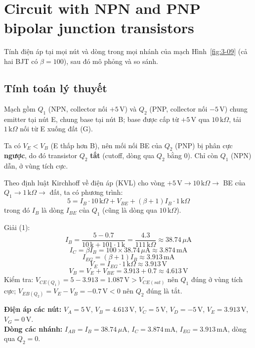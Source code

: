 \section{Circuit with NPN and PNP bipolar junction transistors}
Tính điện áp tại mọi nút và dòng trong mọi nhánh của mạch Hình~\ref{fig:3-09} (cả hai BJT có $\beta = 100$), sau đó mô phỏng và so sánh.


\subsection{Tính toán lý thuyết}
Mạch gồm $Q_1$ (NPN, collector nối $+5\,\text{V}$) và $Q_2$ (PNP, collector nối $-5\,\text{V}$) chung emitter tại nút E, chung base tại nút B; base được cấp từ $+5\,\text{V}$ qua $10\,\text{k}\Omega$, tải $1\,\text{k}\Omega$ nối từ E xuống đất (G).

Ta có $V_E < V_B$ (E thấp hơn B), nên mối nối BE của $Q_2$ (PNP) bị phân cực \textbf{ngược}, do đó transistor $Q_2$ \textbf{tắt} (cutoff, dòng qua $Q_2$ bằng $0$). Chỉ còn $Q_1$ (NPN) dẫn, ở vùng tích cực.

Theo định luật Kirchhoff về điện áp (KVL) cho vòng $+5\,\text{V} \to 10\,\text{k}\Omega \to$ BE của $Q_1 \to 1\,\text{k}\Omega \to$ đất, ta có phương trình:
\[ 5 = I_B\cdot 10\,\text{k}\Omega + V_{BE} + (\beta + 1) I_B \cdot 1\,\text{k}\Omega \tag{1} \]
trong đó $I_B$ là dòng $I_{BE}$ của $Q_1$ (cũng là dòng qua $10\,\text{k}\Omega$).

Giải (1):
\[ I_B = \frac{5 - 0.7}{10\,\text{k} + 101\cdot 1\,\text{k}} = \frac{4.3}{111\,\text{k}\Omega} \approx 38.74\,\mu\text{A} \]
\[ I_C = \beta I_B = 100\times 38.74\,\mu\text{A} \approx 3.874\,\text{mA} \]
\[ I_{EG} = (\beta + 1) I_B \approx 3.913\,\text{mA} \]
\[ V_E = I_{EG}\cdot 1\,\text{k}\Omega \approx 3.913\,\text{V} \]
\[ V_B = V_E + V_{BE} = 3.913 + 0.7 \approx 4.613\,\text{V} \]
Kiểm tra: $V_{CE(Q_1)} = 5 - 3.913 = 1.087\,\text{V} > V_{CE(sat)}$ nên $Q_1$ đúng ở vùng tích cực; $V_{EB(Q_2)} = V_E - V_B = -0.7\,\text{V} < 0$ nên $Q_2$ đúng là tắt.

\begin{dapsobox}
\textbf{Điện áp các nút:} $V_A = 5\,\text{V}$, $V_B = 4.613\,\text{V}$, $V_C = 5\,\text{V}$, $V_D = -5\,\text{V}$, $V_E = 3.913\,\text{V}$, $V_G = 0\,\text{V}$. \\
\textbf{Dòng các nhánh:} $I_{AB} = I_B = 38.74\,\mu\text{A}$, $I_C = 3.874\,\text{mA}$, $I_{EG} = 3.913\,\text{mA}$, dòng qua $Q_2 = 0$.
\end{dapsobox}

